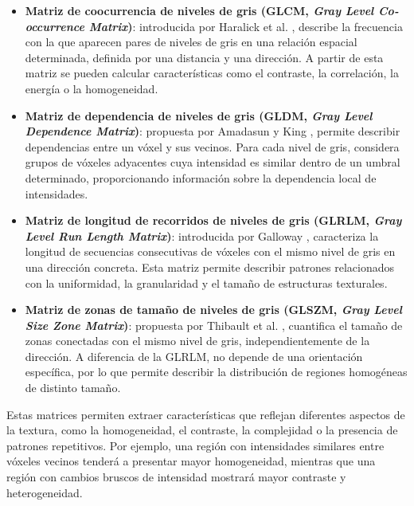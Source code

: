 \begin{itemize}
    \item \textbf{Matriz de coocurrencia de niveles de gris (GLCM, \textit{Gray Level Co-occurrence Matrix})}: introducida por Haralick et al. \cite{haralick2007textural}, describe la frecuencia con la que aparecen pares de niveles de gris en una relación espacial determinada, definida por una distancia y una dirección. A partir de esta matriz se pueden calcular características como el contraste, la correlación, la energía o la homogeneidad.
    \item \textbf{Matriz de dependencia de niveles de gris (GLDM, \textit{Gray Level Dependence Matrix})}: propuesta por Amadasun y King \cite{amadasun1989textural}, permite describir dependencias entre un vóxel y sus vecinos. Para cada nivel de gris, considera grupos de vóxeles adyacentes cuya intensidad es similar dentro de un umbral determinado, proporcionando información sobre la dependencia local de intensidades.
    \item \textbf{Matriz de longitud de recorridos de niveles de gris (GLRLM, \textit{Gray Level Run Length Matrix})}: introducida por Galloway \cite{galloway1974texture}, caracteriza la longitud de secuencias consecutivas de vóxeles con el mismo nivel de gris en una dirección concreta. Esta matriz permite describir patrones relacionados con la uniformidad, la granularidad y el tamaño de estructuras texturales.
    \item \textbf{Matriz de zonas de tamaño de niveles de gris (GLSZM, \textit{Gray Level Size Zone Matrix})}: propuesta por Thibault et al. \cite{thibault2013advanced}, cuantifica el tamaño de zonas conectadas con el mismo nivel de gris, independientemente de la dirección. A diferencia de la GLRLM, no depende de una orientación específica, por lo que permite describir la distribución de regiones homogéneas de distinto tamaño.
\end{itemize}

Estas matrices permiten extraer características que reflejan diferentes aspectos de la textura, como la homogeneidad, el contraste, la complejidad o la presencia de patrones repetitivos. Por ejemplo, una región con intensidades similares entre vóxeles vecinos tenderá a presentar mayor homogeneidad, mientras que una región con cambios bruscos de intensidad mostrará mayor contraste y heterogeneidad.



